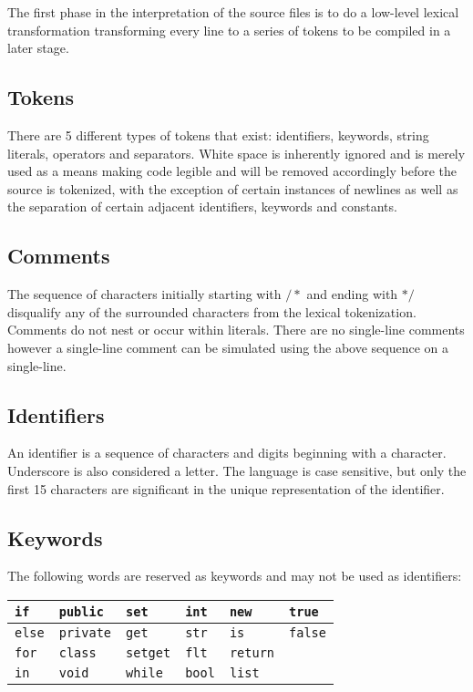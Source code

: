 \documentclass[12pt]{report}
\begin{document}
The first phase in the interpretation of the source files is to do a low-level lexical transformation transforming every line to a series of tokens to be compiled in a later stage.

\subsection{Tokens}

There are 5 different types of tokens that exist: identifiers, keywords, string literals, operators and separators. White space is inherently ignored and is merely used as a means making code legible and will be removed accordingly before the source is tokenized, with the exception of certain instances of newlines as well as the separation of certain adjacent identifiers, keywords and constants.

\subsection{Comments}

The sequence of characters initially starting with $/*$ and ending with $*/$ disqualify any of the surrounded characters from the lexical tokenization. Comments do not nest or occur within literals. There are no single-line comments however a single-line comment can be simulated using the above sequence on a single-line.

\subsection{Identifiers}

An identifier is a sequence of characters and digits beginning with a character. Underscore is also considered a letter. The language is case sensitive, but only the first 15 characters are significant in the unique representation of the identifier.

\subsection{Keywords}

The following words are reserved as keywords and may not be used as identifiers:

\begin{center}
\begin{tabular}{ | l | l | l | l | l | l | }
\hline
\texttt{if} & \texttt{public} & \texttt{set} & \texttt{int} & \texttt{new} & \texttt{true} \\
\hline
\texttt{else} & \texttt{private} & \texttt{get} & \texttt{str} & \texttt{is} & \texttt{false} \\
\hline
\texttt{for} & \texttt{class} & \texttt{setget} & \texttt{flt} & \texttt{return} & \\
\hline
\texttt{in} & \texttt{void} & \texttt{while} & \texttt{bool} & \texttt{list} & \\
\hline
\end{tabular}
\end{center}
\end{document}
